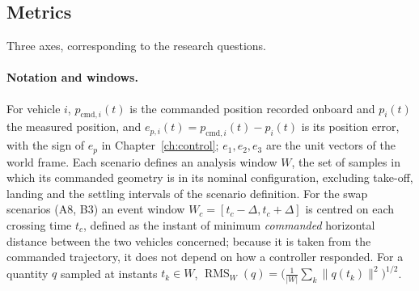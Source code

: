 \subsection{Metrics}
\label{sec:setup-metrics}

Three axes, corresponding to the research questions.

\paragraph{Notation and windows.} For vehicle $i$, $p_{\mathrm{cmd},i}(t)$ is the commanded position
recorded onboard and $p_i(t)$ the measured position, and $e_{p,i}(t) = p_{\mathrm{cmd},i}(t) - p_i(t)$ is its
position error, with the sign of $e_p$ in Chapter~\ref{ch:control}; $e_1, e_2, e_3$ are the unit
vectors of the world frame.
Each scenario defines an analysis window $W$, the set of samples in which its commanded geometry is
in its nominal configuration, excluding take-off, landing and the settling intervals of the
scenario definition. For the swap scenarios (A8, B3) an event window
$W_c = [t_c - \Delta, t_c + \Delta]$ is centred on each crossing time $t_c$, defined as the instant
of minimum \emph{commanded} horizontal distance between the two vehicles concerned; because it is
taken from the commanded trajectory, it does not depend on how a controller responded.
For a quantity $q$ sampled at instants $t_k \in W$, $\operatorname{RMS}_W(q) =
\big(\tfrac{1}{\lvert W\rvert}\sum_{k} \lVert q(t_k)\rVert^2\big)^{1/2}$.

